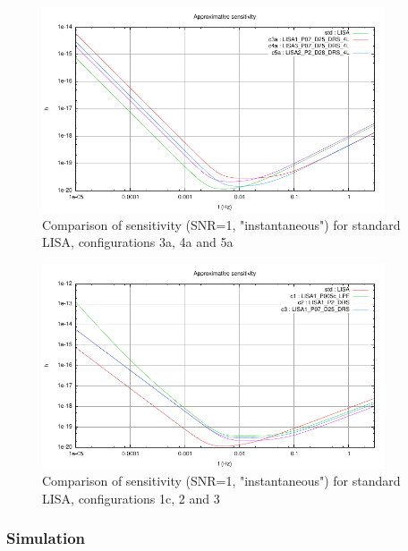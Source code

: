 \documentclass{iopart}
\begin{document}
\begin{figure}[htbp]
\begin{center}
\includegraphics[width=0.9\textwidth]{FigNoiseOrbSens/Sensitivity_std-c3-c4-c5}
\caption{Comparison of sensitivity (SNR=1, "instantaneous") for standard LISA, configurations 3a, 4a and 5a}
\label{F:SensCompC3C4C5}
\end{center}
\end{figure}


\begin{figure}[htbp]
\begin{center}
\includegraphics[width=0.9\textwidth]{FigNoiseOrbSens/Sensitivity_std-c1-c2-c3}
\caption{Comparison of sensitivity (SNR=1, "instantaneous") for standard LISA, configurations 1c, 2 and 3}
\label{F:SensCompC1C2C3}
\end{center}
\end{figure}


\subsubsection{Simulation}
\label{SSS:Inst:PSD:Sim}
\end{document}
